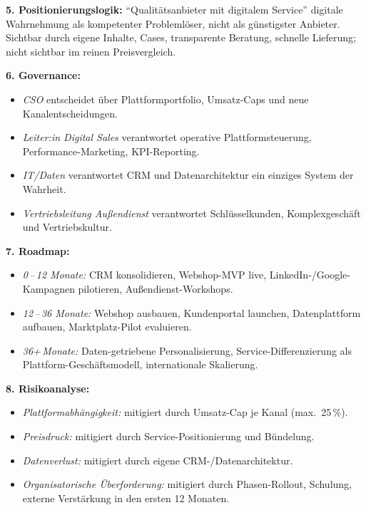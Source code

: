 \documentclass[11pt,a4paper,oneside]{article}
\begin{document}
\begin{loesungbox}
\textbf{5. Positionierungslogik:} ``Qualitätsanbieter mit digitalem Service'' \textendash{} digitale Wahrnehmung als kompetenter Problemlöser, nicht als günstigster Anbieter. Sichtbar durch eigene Inhalte, Cases, transparente Beratung, schnelle Lieferung; nicht sichtbar im reinen Preisvergleich.

\smallskip
\textbf{6. Governance:}
\begin{itemize}
  \item \emph{CSO} entscheidet über Plattformportfolio, Umsatz-Caps und neue Kanalentscheidungen.
  \item \emph{Leiter:in Digital Sales} verantwortet operative Plattformsteuerung, Performance-Marketing, KPI-Reporting.
  \item \emph{IT/Daten} verantwortet CRM und Datenarchitektur \textendash{} ein einziges System der Wahrheit.
  \item \emph{Vertriebsleitung Außendienst} verantwortet Schlüsselkunden, Komplexgeschäft und Vertriebskultur.
\end{itemize}

\textbf{7. Roadmap:}
\begin{itemize}
  \item \emph{0\,--\,12 Monate:} CRM konsolidieren, Webshop-MVP live, LinkedIn-/Google-Kampagnen pilotieren, Außendienst-Workshops.
  \item \emph{12\,--\,36 Monate:} Webshop ausbauen, Kundenportal launchen, Datenplattform aufbauen, Marktplatz-Pilot evaluieren.
  \item \emph{36+\,Monate:} Daten-getriebene Personalisierung, Service-Differenzierung als Plattform-Geschäftsmodell, internationale Skalierung.
\end{itemize}

\textbf{8. Risikoanalyse:}
\begin{itemize}
  \item \emph{Plattformabhängigkeit:} mitigiert durch Umsatz-Cap je Kanal (max.\ 25\,\%).
  \item \emph{Preisdruck:} mitigiert durch Service-Positionierung und Bündelung.
  \item \emph{Datenverlust:} mitigiert durch eigene CRM-/Datenarchitektur.
  \item \emph{Organisatorische Überforderung:} mitigiert durch Phasen-Rollout, Schulung, externe Verstärkung in den ersten 12 Monaten.
\end{itemize}


\end{loesungbox}
\end{document}
